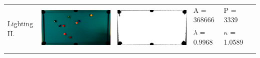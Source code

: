 \begin{tabular}{|l|c|c|l|l|c|}
\multirow{4}{*}{Lighting II.} & \multirow{4}{*}{\includegraphics[scale=0.1]{../images/1/8_img.png}} & \multirow{4}{*}{\includegraphics[scale=0.1]{../images/1/8_mask.png}} & A = 368666 & P = 3339 & \multirow{4}{*}{}\\ 
& & & $\lambda$ = 0.9968 & $\kappa$ = 1.0589 & \\
&&&&&\\
&&&&&\\
\hline


\end{tabular}
